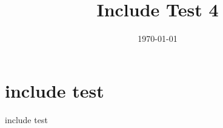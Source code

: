 \documentclass[12pt, english, a4paper]{article}
\begin{document}
\title{Include Test 4}
\date{\today}
\maketitle

\section{include test}

include test
\end{document}
